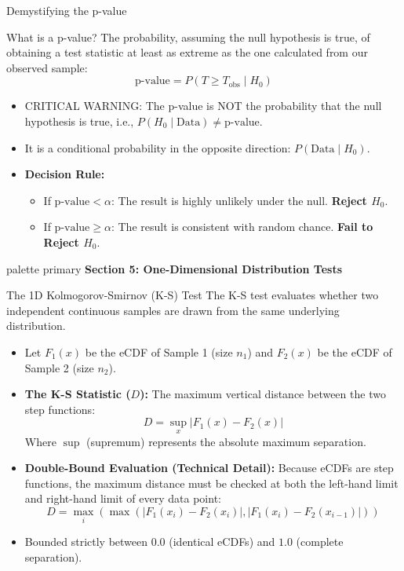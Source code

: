 \documentclass[9pt]{beamer}
\begin{document}
\begin{frame}{Demystifying the p-value}
  \begin{block}{What is a p-value?}
    The probability, assuming the null hypothesis is true, of obtaining a test statistic at least as extreme as the one calculated from our observed sample:
    $$\text{p-value} = P(T \ge T_{\text{obs}} \mid H_0)$$
  \end{block}
  \begin{itemize}
    \item \alert{CRITICAL WARNING:} The p-value is NOT the probability that the null hypothesis is true, i.e., $P(H_0 \mid \text{Data}) \ne \text{p-value}$.
    \item It is a conditional probability in the opposite direction: $P(\text{Data} \mid H_0)$.
    \item \textbf{Decision Rule:}
      \begin{itemize}
        \item If $\text{p-value} < \alpha$: The result is highly unlikely under the null. \textbf{Reject $H_0$}.
        \item If $\text{p-value} \ge \alpha$: The result is consistent with random chance. \textbf{Fail to Reject $H_0$}.
      \end{itemize}
  \end{itemize}
\end{frame}

\begin{frame}[plain]
  \vfill
  \centering
  \begin{beamercolorbox}[sep=8pt,center,shadow=true,rounded=true]{palette primary}
    \textbf{Section 5: One-Dimensional Distribution Tests}
  \end{beamercolorbox}
  \vfill
\end{frame}

\begin{frame}{The 1D Kolmogorov-Smirnov (K-S) Test}
  The K-S test evaluates whether two independent continuous samples are drawn from the same underlying distribution.
  \begin{itemize}
    \item Let $F_1(x)$ be the eCDF of Sample 1 (size $n_1$) and $F_2(x)$ be the eCDF of Sample 2 (size $n_2$).
    \item \textbf{The K-S Statistic ($D$):} The maximum vertical distance between the two step functions:
      $$D = \sup_x |F_1(x) - F_2(x)|$$
      Where $\sup$ (supremum) represents the absolute maximum separation.
    \item \textbf{Double-Bound Evaluation (Technical Detail):}
      Because eCDFs are step functions, the maximum distance must be checked at both the left-hand limit and right-hand limit of every data point:
      $$D = \max_{i} \left( \max \left( |F_1(x_i) - F_2(x_i)|, |F_1(x_i) - F_2(x_{i-1})| \right) \right)$$
    \item Bounded strictly between $0.0$ (identical eCDFs) and $1.0$ (complete separation).
  \end{itemize}
\end{frame}
\end{document}
